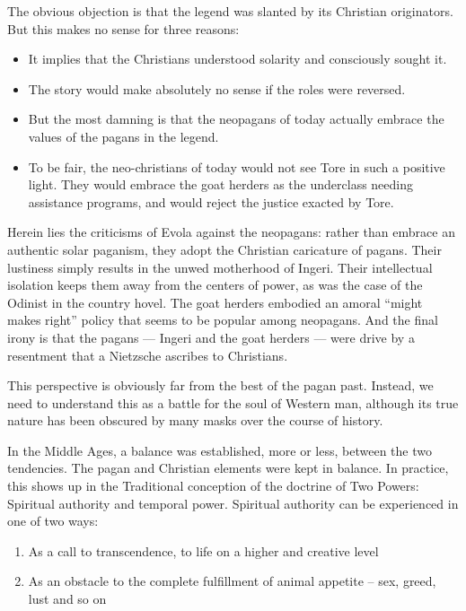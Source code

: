 The obvious objection is that the legend was slanted by its Christian originators. But this makes no sense for three reasons:

\begin{itemize}
\item It implies that the Christians understood solarity and consciously sought it.
\item The story would make absolutely no sense if the roles were reversed.
\item But the most damning is that the neopagans of today actually embrace the values of the pagans in the legend.
\item To be fair, the neo-christians of today would not see Tore in such a positive light. They would embrace the goat herders as the underclass needing assistance programs, and would reject the justice exacted by Tore.
\end{itemize}

Herein lies the criticisms of Evola against the neopagans: rather than embrace an authentic solar paganism, they adopt the Christian caricature of pagans. Their lustiness simply results in the unwed motherhood of Ingeri. Their intellectual isolation keeps them away from the centers of power, as was the case of the Odinist in the country hovel. The goat herders embodied an amoral ``might makes right'' policy that seems to be popular among neopagans. And the final irony is that the pagans --- Ingeri and the goat herders --- were drive by a resentment that a Nietzsche ascribes to Christians.

This perspective is obviously far from the best of the pagan past. Instead, we need to understand this as a battle for the soul of Western man, although its true nature has been obscured by many masks over the course of history.

In the Middle Ages, a balance was established, more or less, between the two tendencies. The pagan and Christian elements were kept in balance. In practice, this shows up in the Traditional conception of the doctrine of Two Powers: Spiritual authority and temporal power. Spiritual authority can be experienced in one of two ways:

\begin{enumerate}


\item As a call to transcendence, to life on a higher and creative level

\item As an obstacle to the complete fulfillment of animal appetite -- sex, greed, lust and so on
\end{enumerate}


